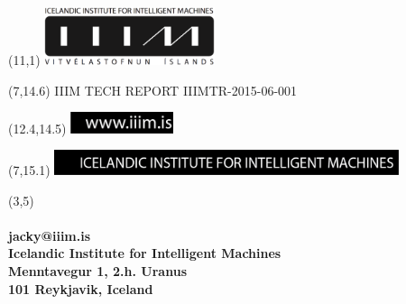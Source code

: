 \begin{titlingpage}
\begin{textblock}{2}
\end{textblock}
\begin{textblock}{5}(11,1)
  {\includegraphics[width=5cm]{iiim/IIIM-logo.eps}}
\end{textblock}
\begin{textblock}{8}(7,14.6) {IIIM TECH REPORT IIIMTR-2015-06-001}
\end{textblock}
\begin{textblock}{5}(12.4,14.5)
  {\includegraphics[width=3cm]{iiim/wwwiiimis-black-box.eps}}
\end{textblock}
\begin{textblock}{5}(7,15.1)
   \includegraphics[width=10.1cm]{iiim/IIIM-black-box.eps}
\end{textblock}

\begin{textblock}{10}(3,5)
{
\textbf{
\huge  
\thetitle \\ 
\vspace{2mm} 
\theauthor \\
\vspace{2mm} 
\small jacky@iiim.is \\
\vspace{5mm} 
\large Icelandic Institute for Intelligent Machines \\
\large Menntavegur 1, 2.h. Uranus \\
\large 101 Reykjavik, Iceland\\ 
\vspace{4mm} 
}}
\end{textblock}
\end{titlingpage}



